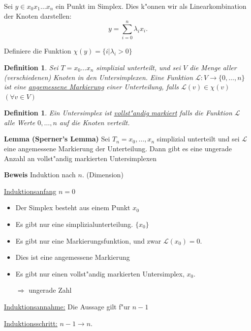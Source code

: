 \documentclass[11pt, a4paper, twoside]{article}
\newtheorem{defi}[satz]{Definition}
\numberwithin{equation}{section}
\begin{document}
Sei $y\in x_0x_1\ldots x_n$ ein Punkt im Simplex.
Dies k"onnen wir als Linearkombination der Knoten darstellen:
$$y=\sum_{i=0}^n\lambda_ix_i.$$

Definiere die Funktion $\chi(y)=\{i | \lambda_i>0\}$

\begin{defi}
Sei $T=x_0\ldots x_n$ simplizial unterteilt, und sei $V$ die Menge aller (verschiedenen) Knoten in den Untersimplexen.
Eine Funktion $\mathcal{L}:V\rightarrow\{0,\ldots,n\}$ ist eine \underline{angemessene Markierung} einer Unterteilung,
falls $\mathcal{L}(v)\in\chi(v)$ $(\forall v\in V)$ 

\end{defi}

\begin{defi}
Ein Untersimplex ist \underline{vollst"andig markiert} falls die Funktion $\mathcal{L}$ alle Werte $0,\ldots,n$ auf die Knoten verteilt.

\end{defi}

\textbf{Lemma (Sperner's Lemma)}
Sei $T_n=x_0,\ldots,x_n$ simplizial unterteilt und sei $\mathcal{L}$ eine angemessene Markierung der Unterteilung.
Dann gibt es eine ungerade Anzahl an vollst"andig markierten Untersimplexen

\textbf{Beweis}
Induktion nach $n$. (Dimension)

\underline{Induktionsanfang}
$n=0$
\begin{itemize}

\item
Der Simplex besteht aus einem Punkt $x_0$

\item
Es gibt nur eine simplizialunterteilung. $\{x_0\}$

\item
Es gibt nur eine Markierungsfunktion, und zwar $\mathcal{L}(x_0)=0$.

\item
Dies ist eine angemessene Markierung

\item
Es gibt nur einen vollst"andig markierten Untersimplex, $x_0$.

$\Rightarrow$ ungerade Zahl

\end{itemize}

\underline{Induktionsannahme:}
Die Aussage gilt f"ur $n-1$

\underline{Induktionsschritt:}
$n-1\rightarrow n.$
\end{document}
